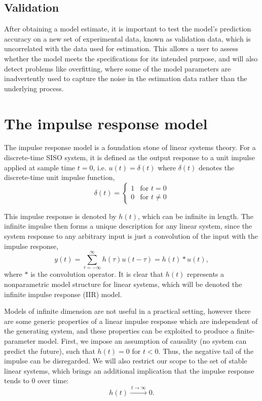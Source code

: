 \subsection{Validation}

After obtaining a model estimate, it is important to test the model's prediction accuracy on a new set of experimental data, known as validation data, which is uncorrelated with the data used for estimation. This allows a user to assess whether the model meets the specifications for its intended purpose, and will also detect problems like overfitting, where some of the model parameters are inadvertently used to capture the noise in the estimation data rather than the underlying process.   

\section{The impulse response model}

The impulse response model is a foundation stone of linear systems theory. For a discrete-time SISO system, it is defined as the output response to a unit impulse applied at sample time $t=0$, i.e. $u(t) = \delta(t)$ where $\delta(t)$ denotes the discrete-time unit impulse function,
\begin{equation}
\delta(t) = \begin{cases} 1 & \text{for } t = 0 \\
0 & \text{for } t \neq 0 \end{cases}
\end{equation}

This impulse response is denoted by $h(t)$, which can be infinite in length. The infinite impulse then forms a unique description for any linear system, since the system response to any arbitrary input is just a convolution of the input with the impulse response,
\begin{equation}
\label{eq:IIRdefn}
y(t) = \sum_{\tau=-\infty}^{\infty} h(\tau) u(t-\tau) = h(t) * u(t),
\end{equation}
where $*$ is the convolution operator. It is clear that $h(t)$ represents a nonparametric model structure for linear systems, which will be denoted the infinite impulse response (IIR) model.

Models of infinite dimension are not useful in a practical setting, however there are some generic properties of a linear impulse response which are independent of the generating system, and these properties can be exploited to produce a finite-parameter model. First, we impose an assumption of causality (no system can predict the future), such that $h(t) = 0$ for $t<0$. Thus, the negative tail of the impulse can be disregarded. We will also restrict our scope to the set of stable linear systems, which brings an additional implication that the impulse response tends to 0 over time:
\begin{equation}
h(t) \xrightarrow{\: t \to \infty \:} 0.
\end{equation} 

